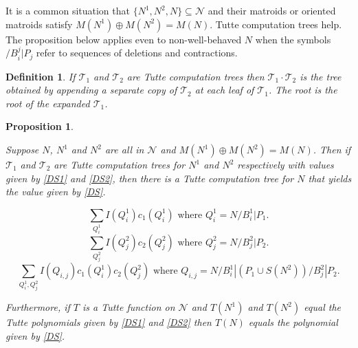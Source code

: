 \documentclass[12pt,leqno]{amsart}
\newtheorem{prop}[lem]{Proposition}
\newtheorem{definition}[lem]{Definition}
\theoremstyle{remark}
\begin{document}
\label{DirectSec}

It is a common situation that $\{N^1,N^2,N\}\subseteq\mathcal{N}$
and their matroids or oriented matroids 
satisfy $M(N^1)\oplus M(N^2)=M(N)$.
Tutte computation trees help.  The proposition below applies
even to non-well-behaved $N$ when the symbols
$/B^j_i|P_j$ refer to sequences of deletions and contractions.

\begin{definition}
If $\mathcal{T}_1$ and $\mathcal{T}_2$ are Tutte computation trees then
$\mathcal{T}_1\cdot \mathcal{T}_2$ is the tree obtained by appending
a separate copy of $\mathcal{T}_2$ at each leaf of $\mathcal{T}_1$.
The root is the root of the expanded $\mathcal{T}_1$.
\end{definition}

\begin{prop}
\label{SumProp2}

Suppose $N$, $N^1$ and $N^2$ are all in $\mathcal{N}$
and $M(N^1)\oplus M(N^2)=M(N)$.  Then if
$\mathcal{T}_1$ and $\mathcal{T}_2$ are Tutte computation
trees for $N^1$ and $N^2$ respectively with values given
by \eqref{DS1} and \eqref{DS2}, then there is a Tutte
computation tree for $N$ that yields the value given
by \eqref{DS}.

\begin{equation}
\label{DS1}
\tag{DS1}
\sum_{Q^1_i}I(Q^1_{i})c_1(Q^1_{i})\text{ where }Q^1_i=N/B^1_i|P_1.
\end{equation}
\begin{equation}
\label{DS2}
\tag{DS2}
\sum_{Q^2_j}I(Q^2_{j})c_2(Q^2_{j})\text{ where }Q^2_j=N/B^2_j|P_2.
\end{equation}
\begin{equation}
\tag{DS}
\label{DS}
\sum_{Q^1_i,Q^2_j}I(Q_{i,j})c_1(Q^1_{i})c_2(Q^2_{j})
\text{ where }Q_{i,j}=N/B^1_i|(P_1\cup S(N^2))/B^2_j|P_2.
\end{equation}

Furthermore, if $T$ is a Tutte function on $\mathcal{N}$
and $T(N^1)$ and $T(N^2)$ equal the Tutte polynomials
given by \eqref{DS1} and \eqref{DS2} then 
$T(N)$ equals the polynomial given by \eqref{DS}.
\end{prop}
\end{document}
